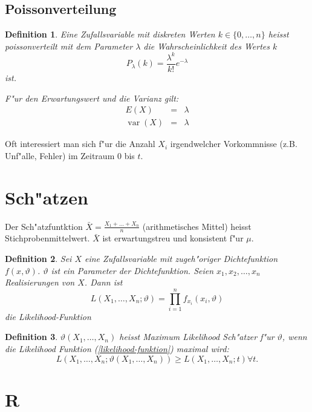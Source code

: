 \documentclass[ngerman, a4paper, 10pt, twocolumn, DIV20, headings=small]{scrartcl}
\newtheorem{definition}{Definition}
\begin{document}
\subsection{Poissonverteilung}
\label{sec:poisson}

\begin{definition}
Eine Zufallsvariable mit diskreten Werten $k\in\{0,\dots,n\}$
heisst poissonverteilt mit dem Parameter $ \lambda $ die Wahrscheinlichkeit
des Wertes $k$ 
\[
P_\lambda(k)=\frac{\lambda^k}{k!}e^{-\lambda}
\]
ist.

F"ur den Erwartungswert und die Varianz gilt:
\begin{eqnarray*}
E(X)&=&\lambda\\
\operatorname{var}(X)&=&\lambda
\end{eqnarray*}
\end{definition}

Oft interessiert man sich f"ur die Anzahl $X_i$ irgendwelcher Vorkommnisse (z.B. Unf"alle, Fehler) im Zeitraum $0$ bis $t$.

\section{Sch"atzen}
\label{sec:schaetzen}

Der Sch"atzfuntktion $\bar X=\frac{X_1+\dots+X_n}{n}$ (arithmetisches Mittel) heisst Stichprobenmittelwert. $\bar X$ ist erwartungstreu und konsistent f"ur $ \mu $. 

\begin{definition}
  Sei $X$ eine Zufallsvariable mit zugeh"origer Dichtefunktion $f(x, \vartheta)$. $\vartheta$ ist ein Parameter der Dichtefunktion. Seien $x_1,x_2, \dots, x_n $ Realisierungen von $X$. Dann ist
\[
L(X_1,\dots,X_n;\vartheta) = \prod_{i=1}^{n}f_{x_i}(x_i,\vartheta)
\]
die Likelihood-Funktion
\end{definition}

\begin{definition}
  $\vartheta(X_1,\dots,X_n)$ heisst Maximum Likelihood Sch"atzer f"ur
$\vartheta$, wenn die Likelihood Funktion (\ref{likelihood-funktion})
maximal wird:
\begin{equation}
L(X_1,\dots,X_n;\vartheta(X_1,\dots,X_n)) \ge L(X_1,\dots,X_n;t)\forall t.
\end{equation}
\end{definition}

\section{R}
\label{sec:r}
\end{document}
